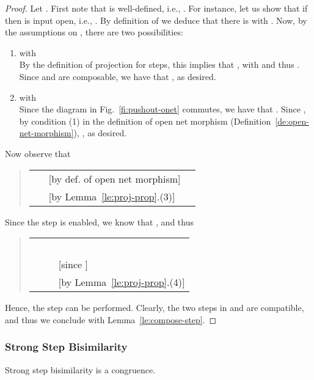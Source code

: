 \documentclass{LMCS}
\begin{document}
\begin{proof}
  Let . 
  First note that  is well-defined, i.e., .
For instance, let us show that if  then  is
  input open, i.e., .  By definition of  we
  deduce that there is  with . Now, by the assumptions on , there are two
  possibilities:
  \begin{enumerate}[]
  
  \item  with \\
    By the definition of projection for steps, this implies that
    , with  and thus
    .  Since  and  are composable, we
    have that ,
    as desired.

  
  \item  with \\
    Since the diagram in Fig.~\ref{fi:pushout-onet} commutes, we have
    that . Since , by condition (1) in the definition of open net
    morphism (Definition~\ref{de:open-net-morphism}), , as desired.
  \end{enumerate}
Now observe that
  \begin{quote}
    \begin{tabular}{lll}
      \\
      \ \quad   \quad & [by def. of open
      net morphism]\\
      \ \quad  & [by Lemma~\ref{le:proj-prop}.(3)]
    \end{tabular}
  \end{quote}

\noindent
Since the step  is enabled, we know that , and thus
  \begin{quote}
    \begin{tabular}{lll}
      \\
\ \quad \\
\ \quad   
      & \quad & [since ]\\
\ \quad & 
      \quad & [by Lemma~\ref{le:proj-prop}.(4)]
    \end{tabular}
  \end{quote}
  Hence, the step  can be performed. Clearly, the two
  steps in  and  are compatible, and thus we conclude with
  Lemma~\ref{le:compose-step}.
\end{proof}


\subsubsection{Strong Step Bisimilarity}


\begin{thm}
  \label{th:congruence-strong-step}
  Strong step bisimilarity is a congruence.
\end{thm}
\end{document}
